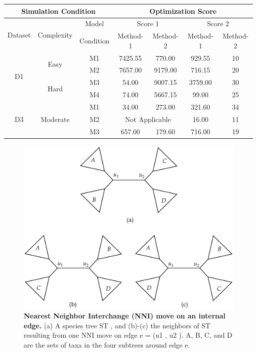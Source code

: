 \documentclass[14pt, a4paper]{article} %
\begin{document}
	\begin{table}
	\label{table:tab1}
    \begin{tabular}{|c|cc|cc|cc|}
        \hline
        \multicolumn{3}{|c|}{Simulation Condition}                  & \multicolumn{4}{c|}{Optimization Score}                   \\ \hline
        \multirow{2}{*}{Dataset} & \multicolumn{1}{l}{\multirow{2}{*}{Complexity}} & Model & \multicolumn{2}{c|}{Score 1} & \multicolumn{2}{c|}{Score 2} \\  
                            & \multicolumn{1}{l}{}     & Condition & Method-1         & Method-2         & Method-1 & Method-2 \\ \hline \hline
        \multirow{4}{*}{D1} & \multirow{2}{*}{Easy}     & M1        & 7425.55          & 770.00           & 929.55   & 10       \\ 
                            &                           & M2        & 7657.00          & 9179.00          & 716.15   & 20       \\ \cline{2-7} 
                            & \multirow{2}{*}{Hard}     & M3        & 54.00            & 9007.15          & 3759.00  & 30       \\ 
                            &                           & M4        & 74.00            & 5667.15          & 99.00    & 25       \\ \hline \hline
        \multirow{3}{*}{D3} & \multirow{3}{*}{Moderate} & M1        & 34.00            & 273.00           & 321.60   & 34       \\ 
                            &                           & M2        & \multicolumn{2}{c|}{Not Applicable} & 16.00    & 11       \\ 
                            &                           & M3        & 657.00           & 179.60           & 716.00   & 19       \\ \hline
    \end{tabular}
    \end{table}
    \pagebreak
    \begin{figure}[t!]
        \centering
        \includegraphics[width=0.7\linewidth]{Figure3.pdf}
        \caption{\textbf{Nearest Neighbor Interchange (NNI) move on an internal edge.} (a)
A species tree ST , and (b)-(c) the neighbors of ST resulting from one NNI move on edge
e = (u1 , u2 ). A, B, C, and D are the sets of taxa in the four subtrees around edge e.
}   \label{fig:fig1}
    \end{figure}
    
\end{document}
